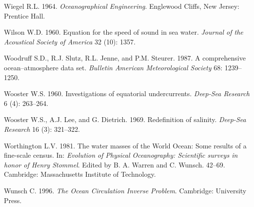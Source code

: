 \begin{thebibliography}{999}
Wiegel R.L.  1964. \textit{Oceanographical Engineering}.  Englewood
Cliffs, New Jersey: Prentice Hall.
%

Wilson W.D.  1960. Equation for the speed of sound in sea
water. \textit{Journal of the Acoustical Society of America} 32 (10):
1357.
%

Woodruff S.D., R.J. Slutz, R.L. Jenne, and P.M. Steurer. 1987. A
comprehensive ocean--atmosphere data set. \textit{Bulletin American
  Meteorological Society} 68: 1239--1250.
%

Wooster W.S.  1960. Investigations of equatorial
undercurrents. \textit{Deep-Sea Research} 6 (4): 263--264.
%

Wooster W.S., A.J. Lee, and G. Dietrich.  1969. Redefinition of
salinity.  \textit{Deep-Sea Research} 16 (3): 321--322.
%

Worthington L.V.  1981. The water masses of the World Ocean: Some
results of a fine-scale census. In: \textit{Evolution of Physical
  Oceanography: Scientific surveys in honor of Henry Stommel}. Edited
by B. A. Warren and C. Wunsch. 42--69. Cambridge: Massachusetts
Institute of Technology.
%

Wunsch C.  1996. \textit{The Ocean Circulation Inverse Problem}.
  Cambridge: University Press.
%


\end{thebibliography}
